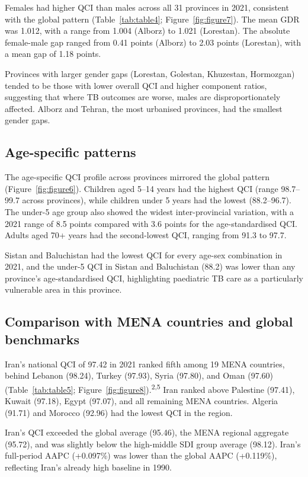 \documentclass[12pt]{article}
\begin{document}
Females had higher QCI than males across all 31 provinces in 2021, consistent with the global pattern (Table~\ref{tab:table4}; Figure~\ref{fig:figure7}). The mean GDR was 1.012, with a range from 1.004 (Alborz) to 1.021 (Lorestan). The absolute female-male gap ranged from 0.41 points (Alborz) to 2.03 points (Lorestan), with a mean gap of 1.18 points.

Provinces with larger gender gaps (Lorestan, Golestan, Khuzestan, Hormozgan) tended to be those with lower overall QCI and higher component ratios, suggesting that where TB outcomes are worse, males are disproportionately affected. Alborz and Tehran, the most urbanised provinces, had the smallest gender gaps.

\subsection{Age-specific patterns}

The age-specific QCI profile across provinces mirrored the global pattern (Figure~\ref{fig:figure6}). Children aged 5--14 years had the highest QCI (range 98.7--99.7 across provinces), while children under 5 years had the lowest (88.2--96.7). The under-5 age group also showed the widest inter-provincial variation, with a 2021 range of 8.5 points compared with 3.6 points for the age-standardised QCI. Adults aged 70+ years had the second-lowest QCI, ranging from 91.3 to 97.7.

Sistan and Baluchistan had the lowest QCI for every age-sex combination in 2021, and the under-5 QCI in Sistan and Baluchistan (88.2) was lower than any province's age-standardised QCI, highlighting paediatric TB care as a particularly vulnerable area in this province.

\subsection{Comparison with MENA countries and global benchmarks}

Iran's national QCI of 97.42 in 2021 ranked fifth among 19 MENA countries, behind Lebanon (98.24), Turkey (97.93), Syria (97.80), and Oman (97.60) (Table~\ref{tab:table5}; Figure~\ref{fig:figure8}).\textsuperscript{2,5} Iran ranked above Palestine (97.41), Kuwait (97.18), Egypt (97.07), and all remaining MENA countries. Algeria (91.71) and Morocco (92.96) had the lowest QCI in the region.

Iran's QCI exceeded the global average (95.46), the MENA regional aggregate (95.72), and was slightly below the high-middle SDI group average (98.12). Iran's full-period AAPC (+0.097\%) was lower than the global AAPC (+0.119\%), reflecting Iran's already high baseline in 1990.
\end{document}
